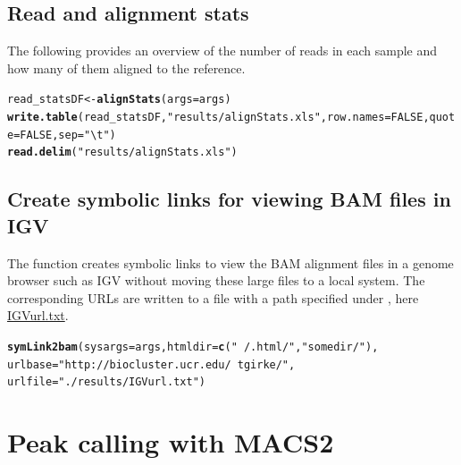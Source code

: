 \documentclass{article}\usepackage[]{graphicx}\usepackage[]{color}
\makeatletter
\newcommand{\hlnum}[1]{\textcolor[rgb]{0.686,0.059,0.569}{#1}}%
\newcommand{\hlstr}[1]{\textcolor[rgb]{0.192,0.494,0.8}{#1}}%
\newcommand{\hlstd}[1]{\textcolor[rgb]{0.345,0.345,0.345}{#1}}%
\newcommand{\hlkwb}[1]{\textcolor[rgb]{0.69,0.353,0.396}{#1}}%
\newcommand{\hlkwc}[1]{\textcolor[rgb]{0.333,0.667,0.333}{#1}}%
\newcommand{\hlkwd}[1]{\textcolor[rgb]{0.737,0.353,0.396}{\textbf{#1}}}%
\newenvironment{kframe}{%
 \def\at@end@of@kframe{}%
 \ifinner\ifhmode%
  \def\at@end@of@kframe{\end{minipage}}%
  \begin{minipage}{\columnwidth}%
 \fi\fi%
 \def\FrameCommand##1{\hskip\@totalleftmargin \hskip-\fboxsep
 \colorbox{shadecolor}{##1}\hskip-\fboxsep
     \hskip-\linewidth \hskip-\@totalleftmargin \hskip\columnwidth}%
 \MakeFramed {\advance\hsize-\width
   \@totalleftmargin\z@ \linewidth\hsize
   \@setminipage}}%
 {\par\unskip\endMakeFramed%
 \at@end@of@kframe}
\newenvironment{knitrout}{}{} %
\makeatother
\begin{document}
\subsection{Read and alignment stats}
The following provides an overview of the number of reads in each sample and how many of them aligned to the reference.
\begin{knitrout}
\color{fgcolor}\begin{kframe}
\begin{alltt}
\hlstd{read_statsDF} \hlkwb{<-} \hlkwd{alignStats}\hlstd{(}\hlkwc{args}\hlstd{=args)}
\hlkwd{write.table}\hlstd{(read_statsDF,} \hlstr{"results/alignStats.xls"}\hlstd{,} \hlkwc{row.names}\hlstd{=}\hlnum{FALSE}\hlstd{,} \hlkwc{quote}\hlstd{=}\hlnum{FALSE}\hlstd{,} \hlkwc{sep}\hlstd{=}\hlstr{"\textbackslash{}t"}\hlstd{)}
\hlkwd{read.delim}\hlstd{(}\hlstr{"results/alignStats.xls"}\hlstd{)}
\end{alltt}
\end{kframe}
\end{knitrout}

\subsection{Create symbolic links for viewing BAM files in IGV}
The  function creates symbolic links to view the BAM alignment files in a genome browser such as IGV without moving these large files to a local system. The corresponding URLs are written to a file with a path specified under , here \href{run:./results/IGVurl.txt}{IGVurl.txt}.
\begin{knitrout}
\color{fgcolor}\begin{kframe}
\begin{alltt}
\hlkwd{symLink2bam}\hlstd{(}\hlkwc{sysargs}\hlstd{=args,} \hlkwc{htmldir}\hlstd{=}\hlkwd{c}\hlstd{(}\hlstr{"~/.html/"}\hlstd{,} \hlstr{"somedir/"}\hlstd{),}
            \hlkwc{urlbase}\hlstd{=}\hlstr{"http://biocluster.ucr.edu/~tgirke/"}\hlstd{,}
            \hlkwc{urlfile}\hlstd{=}\hlstr{"./results/IGVurl.txt"}\hlstd{)}
\end{alltt}
\end{kframe}
\end{knitrout}

\section{Peak calling with MACS2} 
\end{document}
